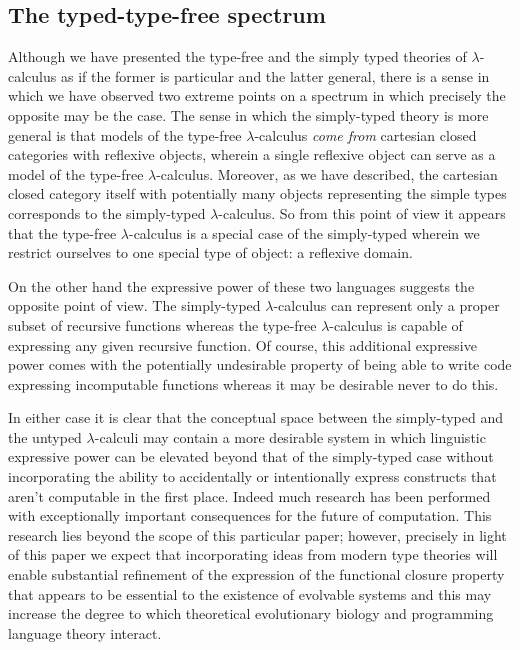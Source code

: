 \subsection*{The typed-type-free spectrum}
Although we have presented the type-free and the simply typed theories of $\lambda$-calculus as if the former is particular and the latter general, there is a sense in which we have observed two extreme points on a spectrum in which precisely the opposite may be the case. The sense in which the simply-typed theory is more general is that models of the type-free $\lambda$-calculus \emph{come from} cartesian closed categories with reflexive objects, wherein a single reflexive object can serve as a model of the type-free $\lambda$-calculus. Moreover, as we have described, the cartesian closed category itself with potentially many objects representing the simple types corresponds to the simply-typed $\lambda$-calculus. So from this point of view it appears that the type-free $\lambda$-calculus is a special case of the simply-typed wherein we restrict ourselves to one special type of object: a reflexive domain.

On the other hand the expressive power of these two languages suggests the opposite point of view. The simply-typed $\lambda$-calculus can represent only a proper subset of recursive functions whereas the type-free $\lambda$-calculus is capable of expressing any given recursive function. Of course, this additional expressive power comes with the potentially undesirable property of being able to write code expressing incomputable functions whereas it may be desirable never to do this.

In either case it is clear that the conceptual space between the simply-typed and the untyped $\lambda$-calculi may contain a more desirable system in which linguistic expressive power can be elevated beyond that of the simply-typed case without incorporating the ability to accidentally or intentionally express constructs that aren't computable in the first place. Indeed much research has been performed with exceptionally important consequences for the future of computation. This research lies beyond the scope of this particular paper; however, precisely in light of this paper we expect that incorporating ideas from modern type theories will enable substantial refinement of the expression of the functional closure property that appears to be essential to the existence of evolvable systems and this may increase the degree to which theoretical evolutionary biology and programming language theory interact.